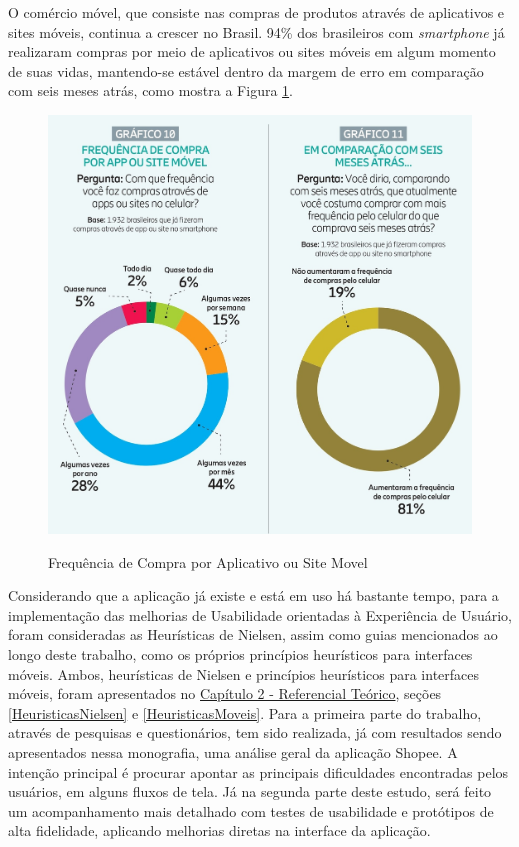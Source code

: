 O comércio móvel, que consiste nas compras de produtos através de aplicativos e sites móveis, continua a crescer no Brasil. 94\% dos brasileiros com \textit{smartphone} já realizaram compras por meio de aplicativos ou sites móveis em algum momento de suas vidas, mantendo-se estável dentro da margem de erro em comparação com seis meses atrás, como mostra a Figura \ref{figura1}.

\begin{figure}[ht]
    \centering
    \caption{Frequência de Compra por Aplicativo ou Site Movel}
    \includegraphics[keepaspectratio=true,scale=0.9]{figuras/cap05graficos1.jpg}
    \label{figura1}
\end{figure}

Considerando que a aplicação já existe e está em uso há bastante tempo, para a implementação das melhorias de Usabilidade orientadas à Experiência de Usuário, foram consideradas as Heurísticas de Nielsen, assim como guias mencionados ao longo deste trabalho, como os próprios princípios heurísticos para interfaces móveis. Ambos, heurísticas de Nielsen e princípios heurísticos para interfaces móveis, foram apresentados no \hyperref[chap:ReferencialTeorico]{Capítulo 2 - Referencial Teórico}, seções \ref{HeuristicasNielsen} e \ref{HeuristicasMoveis}. Para a primeira parte do trabalho, através de pesquisas e questionários, tem sido realizada, já com resultados sendo apresentados nessa monografia, uma análise geral da aplicação Shopee. A intenção principal é procurar apontar as principais dificuldades encontradas pelos usuários, em alguns fluxos de tela. Já na segunda parte deste estudo, será feito um acompanhamento mais detalhado com testes de usabilidade e protótipos de alta fidelidade, aplicando melhorias diretas na interface da aplicação.

